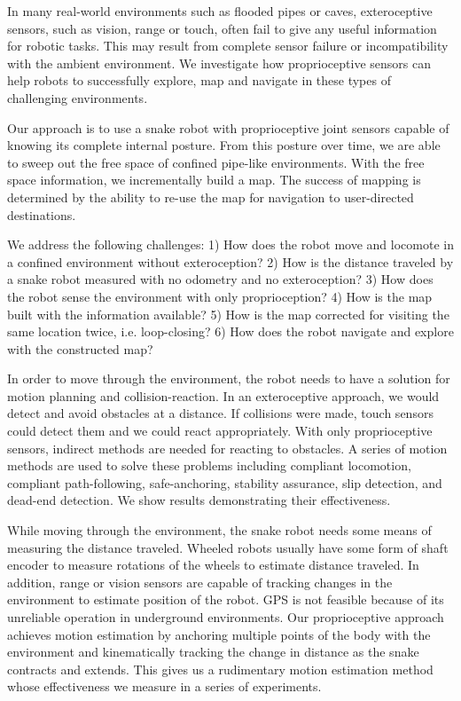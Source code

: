 In many real-world environments such as flooded pipes or caves, exteroceptive sensors, such as vision, range or touch, often fail to give any useful information for robotic tasks.  This may result from complete sensor failure or incompatibility with the ambient environment.  We investigate how proprioceptive sensors can help robots to successfully explore, map and navigate in these types of challenging environments.

Our approach is to use a snake robot with proprioceptive joint sensors capable of knowing its complete internal posture.  From this posture over time, we are able to sweep out the free space of confined pipe-like environments.  With the free space information, we incrementally build a map.  The success of mapping is determined by the ability to re-use the map for navigation to user-directed destinations.

We address the following challenges: 1) How does the robot move and locomote in a confined environment without exteroception?  2) How is the distance traveled by a snake robot measured with no odometry and no exteroception?  3) How does the robot sense the environment with only proprioception?  4)  How is the map built with the information available?  5) How is the map corrected for visiting the same location twice, i.e. loop-closing?  6)  How does the robot navigate and explore with the constructed map?

In order to move through the environment, the robot needs to have a solution for motion planning and collision-reaction.  In an exteroceptive approach, we would detect and avoid obstacles at a distance.  If collisions were made, touch sensors could detect them and we could react appropriately.  With only proprioceptive sensors, indirect methods are needed for reacting to obstacles.  A series of motion methods are used to solve these problems including compliant locomotion, compliant path-following, safe-anchoring, stability assurance, slip detection, and dead-end detection.  We show results demonstrating their effectiveness.

While moving through the environment, the snake robot needs some means of measuring the distance traveled.  Wheeled robots usually have some form of shaft encoder to measure rotations of the wheels to estimate distance traveled.  In addition, range or vision sensors are capable of tracking changes in the environment to estimate position of the robot.   GPS is not feasible because of its unreliable operation in underground environments.  Our proprioceptive approach achieves motion estimation by anchoring multiple points of the body with the environment and kinematically tracking the change in distance as the snake contracts and extends.   This gives us a rudimentary motion estimation method whose effectiveness we measure in a series of experiments.

